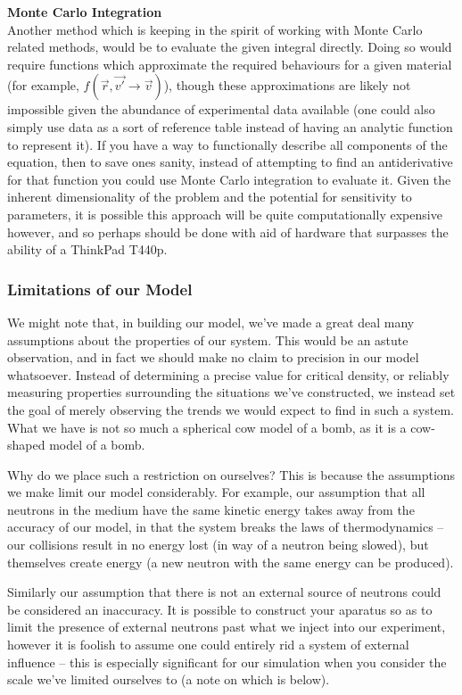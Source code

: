 \noindent \textbf{Monte Carlo Integration} \\
Another method which is keeping in the spirit of working with Monte Carlo related methods, would be to evaluate the given integral directly.
Doing so would require functions which approximate the required behaviours for a given material (for example, $f(\vec{r}, \vec{v'} \to \vec{v})$), 
though these approximations are likely not impossible given the abundance of experimental data available (one could also simply use data as a sort of 
reference table instead of having an analytic function to represent it). If you have a way to functionally describe all components of the equation, then 
to save ones sanity, instead of attempting to find an antiderivative for that function you could use Monte Carlo integration to evaluate it. 
Given the inherent dimensionality of the problem and the potential for sensitivity to parameters, it is possible this approach will be quite 
computationally expensive however, and so perhaps should be done with aid of hardware that surpasses the ability of a ThinkPad T440p.

\subsubsection{Limitations of our Model}

We might note that, in building our model, we've made a great deal many assumptions about the properties of our system. 
This would be an astute observation, and in fact we should make no claim to precision in our model whatsoever. Instead of 
determining a precise value for critical density, or reliably measuring properties surrounding the situations we've constructed, 
we instead set the goal of merely observing the trends we would expect to find in such a system. What we have is not so much 
a spherical cow model of a bomb, as it is a cow-shaped model of a bomb.

Why do we place such a restriction on ourselves? This is because the assumptions we make limit our model considerably. 
For example, our assumption that all neutrons in the medium have the same kinetic energy takes away from the accuracy of our model, 
in that the system breaks the laws of thermodynamics -- our collisions result in no energy lost (in way 
of a neutron being slowed), but themselves create energy (a new neutron with the same energy can be produced). 

Similarly our assumption that there is not an external source of neutrons could be considered an inaccuracy. It is 
possible to construct your aparatus so as to limit the presence of external neutrons past what we inject into our experiment, 
however it is foolish to assume one could entirely rid a system of external influence -- this is especially significant for our 
simulation when you consider the scale we've limited ourselves to (a note on which is below).

